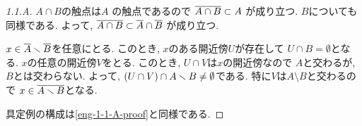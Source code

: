 \documentclass[uplatex, dvipdfmx, a4paper, 12pt, class=jsarticle, crop=false]{standalone}
\begin{document}
\begin{proof}[1.1.A]\label{eng-1-1-A-proof2}
	\(A \cap B\)の触点は\(A\)
	の触点であるので
	\(\overline{A \cap B} \subset A\)
	が成り立つ.
	\(B\)についても同様である.
	よって, \(\overline{A \cap B} \subset
	\overline{A} \cap \overline{B}\)
	が成り立つ.

	\(x \in \overline{A} \smallsetminus
	\overline{B}\)を任意にとる.
	このとき, \(x\)のある開近傍\(U\)が存在して
	\(U \cap B = \emptyset\)となる.
	\(x\)の任意の開近傍\(V\)をとる.
	このとき, \(U \cap V\)は\(x\)の開近傍なので
	\(A\)と交わるが, \(B\)とは交わらない.
	よって, \(\lrparen{U \cap V} \cap A
	\setminus B \neq \emptyset\)である.
	特に\(V\)は\(A \setminus B\)と交わるので
	\(x \in \overline{A \smallsetminus B}\)となる.

	具定例の構成は\cref{eng-1-1-A-proof}と同様である.
\end{proof}
\end{document}
